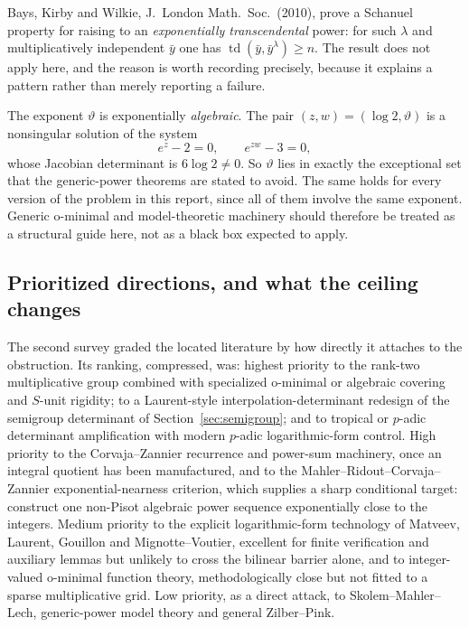 \documentclass[11pt,oneside]{article}
\theoremstyle{definition}
\theoremstyle{remark}
\newcommand{\thetaq}{\vartheta}
\begin{document}
Bays, Kirby and Wilkie, J.\ London Math.\ Soc.\ (2010), prove a Schanuel property for raising
to an \emph{exponentially transcendental} power: for such $\lambda$ and multiplicatively
independent $\bar y$ one has $\operatorname{td}(\bar y,\bar y^{\lambda})\ge n$.  The result does
not apply here, and the reason is worth recording precisely, because it explains a pattern
rather than merely reporting a failure.

The exponent $\thetaq$ is exponentially \emph{algebraic}.  The pair
$(z,w)=(\log2,\thetaq)$ is a nonsingular solution of the system
\[
  e^{z}-2=0,\qquad e^{zw}-3=0,
\]
whose Jacobian determinant is $6\log2\ne0$.  So $\thetaq$ lies in exactly the exceptional set
that the generic-power theorems are stated to avoid.  The same holds for every version of the
problem in this report, since all of them involve the same exponent.  Generic o-minimal and
model-theoretic machinery should therefore be treated as a structural guide here, not as a
black box expected to apply.

\subsection{Prioritized directions, and what the ceiling changes}

The second survey graded the located literature by how directly it attaches to the obstruction.
Its ranking, compressed, was: highest priority to the rank-two multiplicative group combined
with specialized o-minimal or algebraic covering and $S$-unit rigidity; to a Laurent-style
interpolation-determinant redesign of the semigroup determinant of
Section~\ref{sec:semigroup}; and to tropical or $p$-adic determinant amplification with modern
$p$-adic logarithmic-form control.  High priority to the Corvaja--Zannier recurrence and
power-sum machinery, once an integral quotient has been manufactured, and to the
Mahler--Ridout--Corvaja--Zannier exponential-nearness criterion, which supplies a sharp
conditional target: construct one non-Pisot algebraic power sequence exponentially close to the
integers.  Medium priority to the explicit logarithmic-form technology of Matveev, Laurent,
Gouillon and Mignotte--Voutier, excellent for finite verification and auxiliary lemmas but
unlikely to cross the bilinear barrier alone, and to integer-valued o-minimal function theory,
methodologically close but not fitted to a sparse multiplicative grid.  Low priority, as a
direct attack, to Skolem--Mahler--Lech, generic-power model theory and general Zilber--Pink.
\end{document}
